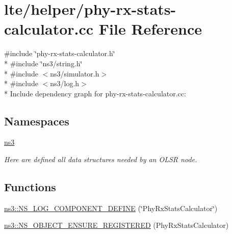 \hypertarget{phy-rx-stats-calculator_8cc}{}\section{lte/helper/phy-\/rx-\/stats-\/calculator.cc File Reference}
\label{phy-rx-stats-calculator_8cc}
{\ttfamily \#include \char`\"{}phy-\/rx-\/stats-\/calculator.\+h\char`\"{}}\\*
{\ttfamily \#include \char`\"{}ns3/string.\+h\char`\"{}}\\*
{\ttfamily \#include $<$ns3/simulator.\+h$>$}\\*
{\ttfamily \#include $<$ns3/log.\+h$>$}\\*
Include dependency graph for phy-\/rx-\/stats-\/calculator.cc\+:
\subsection*{Namespaces}
\begin{DoxyCompactItemize}
\item 
 \hyperlink{namespacens3}{ns3}
\begin{DoxyCompactList}\small\item\em Here are defined all data structures needed by an O\+L\+SR node. \end{DoxyCompactList}\end{DoxyCompactItemize}
\subsection*{Functions}
\begin{DoxyCompactItemize}
\item 
\hyperlink{namespacens3_a879a0f5ba4e76eb9035952d910d601ba}{ns3\+::\+N\+S\+\_\+\+L\+O\+G\+\_\+\+C\+O\+M\+P\+O\+N\+E\+N\+T\+\_\+\+D\+E\+F\+I\+NE} (\char`\"{}Phy\+Rx\+Stats\+Calculator\char`\"{})
\item 
\hyperlink{namespacens3_a236b854a19ae9b6426fc85fb286f1c70}{ns3\+::\+N\+S\+\_\+\+O\+B\+J\+E\+C\+T\+\_\+\+E\+N\+S\+U\+R\+E\+\_\+\+R\+E\+G\+I\+S\+T\+E\+R\+ED} (Phy\+Rx\+Stats\+Calculator)
\end{DoxyCompactItemize}
